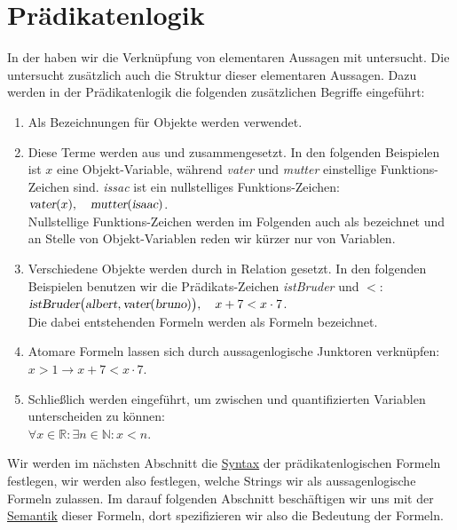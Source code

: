 \chapter{Prädikatenlogik}
In der  haben wir die Verknüpfung von elementaren Aussagen mit  untersucht.
Die  untersucht zusätzlich auch die Struktur dieser elementaren Aussagen.  Dazu werden in der
Prädikatenlogik die folgenden zusätzlichen Begriffe eingeführt:
\begin{enumerate}
\item Als Bezeichnungen für Objekte werden  verwendet.
\item Diese Terme werden aus  und 
      zusammengesetzt.  In den folgenden Beispielen ist $x$ eine Objekt-Variable, während
      \textsl{vater} und \textsl{mutter} einstellige Funktions-Zeichen sind. \textsl{issac} ist ein
      nullstelliges Funktions-Zeichen:
      \\[0.2cm]
      \hspace*{1.3cm}
      $\textsl{vater}(x),\quad \textsl{mutter}(\textsl{isaac})$.
      \\[0.2cm]
      Nullstellige Funktions-Zeichen werden im Folgenden auch als  bezeichnet und an Stelle
      von Objekt-Variablen reden wir kürzer nur von Variablen.
\item Verschiedene Objekte werden durch  in Relation gesetzt.  In den folgenden
      Beispielen benutzen wir die Prädikats-Zeichen \textsl{istBruder} und $<$:
      \\[0.2cm]
      \hspace*{1.3cm}
      $\textsl{istBruder}\bigl(\textsl{albert}, \textsl{vater}(\textsl{bruno})\bigr),\quad x+7 < x\cdot 7$.
      \\[0.2cm]
      Die dabei entstehenden Formeln werden als  Formeln bezeichnet.
\item Atomare Formeln lassen sich durch aussagenlogische Junktoren verknüpfen:
      \\[0.2cm]
      \hspace*{1.3cm}
      $x > 1 \rightarrow x + 7 < x \cdot  7$.
\item Schließlich werden  eingeführt, um zwischen  und
       quantifizierten Variablen unterscheiden
      zu können:
      \\[0.2cm]
      \hspace*{1.3cm}
      $\forall x \in \mathbb{R}: \exists n \in \mathbb{N}: x < n$.
\end{enumerate}
Wir werden im nächsten Abschnitt die \href{https://de.wikipedia.org/wiki/Syntax}{Syntax} der
prädikatenlogischen Formeln festlegen, wir werden also festlegen, welche Strings wir als aussagenlogische
Formeln zulassen.  Im darauf folgenden Abschnitt beschäftigen wir uns mit der 
\href{https://de.wikipedia.org/wiki/Semantik}{Semantik} dieser Formeln, dort spezifizieren wir also die
Bedeutung der Formeln.

